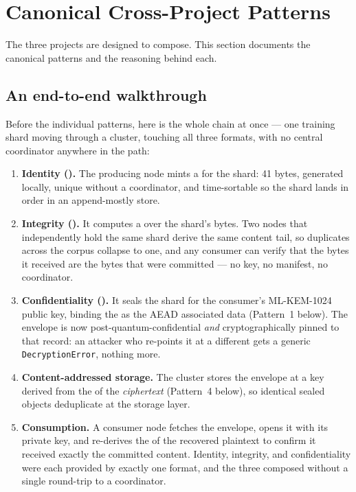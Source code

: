 \section{Canonical Cross-Project Patterns}
\label{sec:patterns}

The three projects are designed to compose. This section documents the canonical patterns and the reasoning behind each.

\subsection{An end-to-end walkthrough}

Before the individual patterns, here is the whole chain at once --- one training shard moving through a cluster, touching all three formats, with no central coordinator anywhere in the path:

\begin{enumerate}
\item \textbf{Identity (\tesseraid{}).} The producing node mints a \tesseraid{} for the shard: 41 bytes, generated locally, unique without a coordinator, and time-sortable so the shard lands in order in an append-mostly store.
\item \textbf{Integrity (\tesserahash{}).} It computes a \tesserahash{} over the shard's bytes. Two nodes that independently hold the same shard derive the same content tail, so duplicates across the corpus collapse to one, and any consumer can verify that the bytes it received are the bytes that were committed --- no key, no manifest, no coordinator.
\item \textbf{Confidentiality (\tesseraseal{}).} It seals the shard for the consumer's ML-KEM-1024 public key, binding the \tesseraid{} as the AEAD associated data (Pattern~1 below). The envelope is now post-quantum-confidential \emph{and} cryptographically pinned to that record: an attacker who re-points it at a different \tesseraid{} gets a generic \texttt{DecryptionError}, nothing more.
\item \textbf{Content-addressed storage.} The cluster stores the envelope at a key derived from the \tesserahash{} of the \emph{ciphertext} (Pattern~4 below), so identical sealed objects deduplicate at the storage layer.
\item \textbf{Consumption.} A consumer node fetches the envelope, opens it with its private key, and re-derives the \tesserahash{} of the recovered plaintext to confirm it received exactly the committed content. Identity, integrity, and confidentiality were each provided by exactly one format, and the three composed without a single round-trip to a coordinator.
\end{enumerate}


